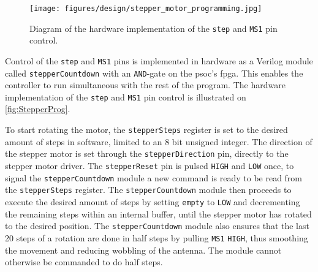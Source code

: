 \begin{figure}[h]
	\centering
	\texttt{[image: figures/design/stepper\_motor\_programming.jpg]}
	\caption{Diagram of the hardware implementation of the \texttt{step} and \texttt{MS1} pin control.}
	\label{fig:StepperProg}
\end{figure}

Control of the \texttt{step} and \texttt{MS1} pins is implemented in hardware as a Verilog module called \texttt{stepperCountdown} with an \texttt{AND}-gate on the \gls{psoc}'s \gls{fpga}. This enables the controller to run simultaneous with the rest of the program. The hardware implementation of the \texttt{step} and \texttt{MS1} pin control is illustrated on \autoref{fig:StepperProg}.

\newpage
To start rotating the motor, the \texttt{stepperSteps} register is set to the desired amount of steps in software, limited to an 8 bit unsigned integer. The direction of the stepper motor is set through the \texttt{stepperDirection} pin, directly to the stepper motor driver. The \texttt{stepperReset} pin is pulsed \texttt{HIGH} and \texttt{LOW} once, to signal the \texttt{stepperCountdown} module a new command is ready to be read from the \texttt{stepperSteps} register. The \texttt{stepperCountdown} module then proceeds to execute the desired amount of steps by setting \texttt{empty} to \texttt{LOW} and decrementing the remaining steps within an internal buffer, until the stepper motor has rotated to the desired position. The \texttt{stepperCountdown} module also ensures that the last 20 steps of a rotation are done in half steps by pulling \texttt{MS1} \texttt{HIGH}, thus smoothing the movement and reducing wobbling of the antenna. The module cannot otherwise be commanded to do half steps. 

